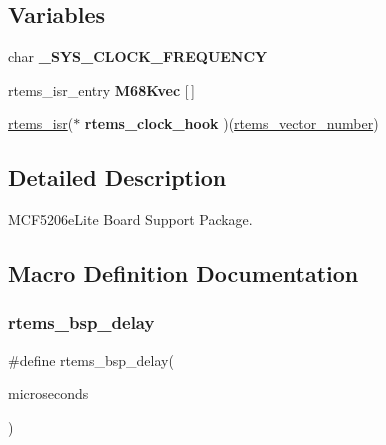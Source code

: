 \subsection*{Variables}
\begin{DoxyCompactItemize}
\item 
\mbox{\label{group__RTEMSBSPsM68kMCF5206Elite_gaff3ffda3c0ef30fe02c213071448ee56}} 
char {\bfseries \+\_\+\+S\+Y\+S\+\_\+\+C\+L\+O\+C\+K\+\_\+\+F\+R\+E\+Q\+U\+E\+N\+CY}
\item 
\mbox{\label{group__RTEMSBSPsM68kMCF5206Elite_ga744e8a50e2dcbb8fb7e6b0c7554008f9}} 
rtems\+\_\+isr\+\_\+entry {\bfseries M68\+Kvec} \mbox{[}$\,$\mbox{]}
\item 
\mbox{\label{group__RTEMSBSPsM68kMCF5206Elite_ga6d054cf6ceb4bb5727c333f20cd3a257}} 
\mbox{\hyperlink{group__ClassicINTR_ga17fb491bd308ce6b1bf27a51dec0b46d}{rtems\+\_\+isr}}($\ast$ {\bfseries rtems\+\_\+clock\+\_\+hook} )(\mbox{\hyperlink{group__ClassicINTR_ga3e434c197d99f128e78cae4d9358bd8b}{rtems\+\_\+vector\+\_\+number}})
\end{DoxyCompactItemize}


\subsection{Detailed Description}
M\+C\+F5206e\+Lite Board Support Package. 



\subsection{Macro Definition Documentation}
\mbox{\label{group__RTEMSBSPsM68kMCF5206Elite_gaa227a93db3561a86689137fbd6e10101}} 
\subsubsection{\texorpdfstring{rtems\_bsp\_delay}{rtems\_bsp\_delay}}
{\footnotesize\ttfamily \#define rtems\+\_\+bsp\+\_\+delay(\begin{DoxyParamCaption}\item[{}]{microseconds }\end{DoxyParamCaption})}

